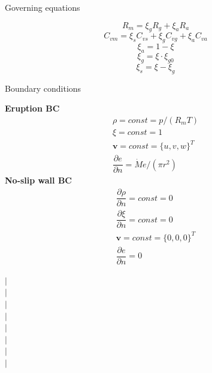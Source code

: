 \documentclass{beamer}
\begin{document}
\begin{frame}{Governing equations}
\begin{minipage}{.46\textwidth}
\begin{equation}
R_m = \xi_g R_g + \xi_a R_a  \label{eq:gov-Rm}
\end{equation}
\begin{equation}
C_{vm} = \xi_s C_{vs} + \xi_g C_{vg} + \xi_a C_{va} \label{eq:gov-Cvm}
\end{equation}
\begin{equation}
\xi_a = 1 - \xi \label{eq:gov-na}
\end{equation}
\begin{equation}
\xi_g = \xi \cdot \xi_{g0} \label{eq:gov-ng}
\end{equation}
\begin{equation}
\xi_s = \xi - \xi_g \label{eq:gov-ns}
\end{equation}
\end{minipage}
%
\end{frame}
%
\begin{frame}{Boundary conditions}
\noindent
\begin{minipage}{.41\textwidth}
\textbf{Eruption BC}
\begin{align}
\rho =const = p/\left(R_m T\right) \label{eq:erupt_bc_rho} \\
\xi=const=1 \label{eq:erupt_bc_xi}\\
\textbf{v} = const =\{u,v,w\}^T \label{eq:erupt_bc_v}\\
\dfrac{\partial e}{\partial n}=\dot M e /\left(\pi r^2\right) \label{eq:erupt_bc_e}
\end{align} 
\textbf{No-slip wall BC}
\begin{align}
\dfrac{\partial \rho}{\partial n} = const = 0\label{eq:wall_bc_rho} \\
\dfrac{\partial \xi}{\partial n} = const = 0 \label{eq:wall_bc_xi}\\ 
\textbf{v} = const =\{0,0,0\}^T \label{eq:wall_bc_v}\\
\dfrac{\partial e }{\partial n} = 0\label{eq:wall_bc_e}
\end{align} 
\end{minipage} %
%
\begin{minipage}{.01\textwidth}
$\vert$\\
$\vert$\\
$\vert$\\
$\vert$\\
$\vert$\\
$\vert$\\
$\vert$\\
$\vert$\\

\end{minipage}
\end{frame}
\end{document}
